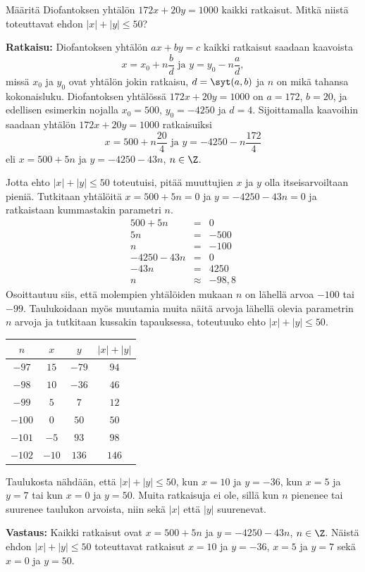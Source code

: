\begin{esimerkki}
Määritä Diofantoksen yhtälön $172x + 20y = 1000$ kaikki
ratkaisut. Mitkä niistä toteuttavat ehdon $|x|+|y|\le
50$?

{\bf Ratkaisu:}
Diofantoksen yhtälön $ax+by=c$ kaikki ratkaisut saadaan
kaavoista
\[
x=x_0+n\frac{b}{d}\textrm{ ja }y=y_0-n\frac{a}{d},
\]
missä $x_0$ ja $y_0$ ovat yhtälön jokin ratkaisu,
$d=\syt(a,b)$ ja $n$ on mikä tahansa
kokonaisluku. Diofantoksen yhtälössä $172x+20y=1000$ on
$a=172$, $b=20$, ja edellisen
esimerkin nojalla $x_0=500$, $y_0=-4250$ ja $d=4$.
Sijoittamalla kaavoihin saadaan
yhtälön $172x+20y=1000$ ratkaisuiksi
\[
x=500+n\frac{20}{4}\textrm{ ja }y=-4250-n\frac{172}{4}
\]
eli $x=500+5n$ ja $y=-4250-43n$, $n\in\Z$.

Jotta ehto $|x| +|y|\le 50$ toteutuisi, pitää muuttujien
$x$ ja $y$ olla itseisarvoiltaan pieniä. Tutkitaan
yhtälöitä $x = 500 + 5n = 0$ ja $y = -4250 - 43n = 0$ ja
ratkaistaan kummastakin parametri $n$.
\begin{eqnarray*}
500 + 5n &=& 0\\
5n &=& -500\\
n &=& -100\\
-4250 - 43n &=& 0\\
-43n &=& 4250\\
n &\approx&-98,8
\end{eqnarray*}
Osoittautuu siis, että molempien yhtälöiden mukaan $n$
on lähellä arvoa $-100$ tai $-99$. Taulukoidaan myös
muutamia muita näitä arvoja lähellä olevia parametrin $n$
arvoja ja tutkitaan kussakin tapauksessa, toteutuuko ehto
$|x| + |y| \le 50$.

\begin{center}
\begin{tabular}{|c|c|c|c|}
\hline
$n$ & $x$ & $y$ & $|x|+|y|$ \\

\hline
$-97$&$15$&$-79$&$94$\\
\hline
$-98$&$10$&$-36$&$46$\\
\hline
$-99$&$5$&$7$&$12$\\
\hline
$-100$&$0$&$50$&$50$\\
\hline
$-101$&$-5$&$93$&$98$\\
\hline
$-102$&$-10$&$136$&$146$\\
\hline
\end{tabular}
\end{center}

Taulukosta nähdään, että $|x|+|y| \le 50$, kun $x = 10$
ja $y = -36$, kun $x = 5$ ja $y = 7$ tai kun $x = 0$ ja
$y = 50$. Muita ratkaisuja ei ole, sillä kun $n$ pienenee
tai suurenee taulukon arvoista, niin sekä $|x|$ että $|
y|$ suurenevat.

{\bf Vastaus:} Kaikki ratkaisut ovat  $x=500+5n$ ja $y=-4250-43n$, $n\in\Z$. Näistä ehdon $|x|+|y|\le 50$ toteuttavat ratkaisut $x = 10$ ja $y = -36$, $x = 5$ ja $y = 7$ sekä $x = 0$ ja $y = 50$.
\end{esimerkki}


